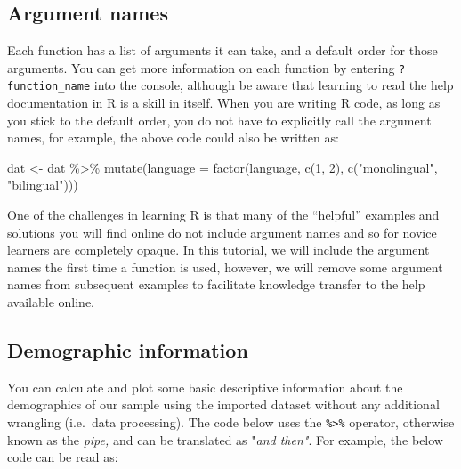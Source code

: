 \documentclass[
  english,
  doc,floatsintext]{apa6}
\newenvironment{Shaded}{\begin{snugshade}}{\end{snugshade}}
\newcommand{\AttributeTok}[1]{\textcolor[rgb]{0.77,0.63,0.00}{#1}}
\newcommand{\DecValTok}[1]{\textcolor[rgb]{0.00,0.00,0.81}{#1}}
\newcommand{\FunctionTok}[1]{\textcolor[rgb]{0.00,0.00,0.00}{#1}}
\newcommand{\NormalTok}[1]{#1}
\newcommand{\OtherTok}[1]{\textcolor[rgb]{0.56,0.35,0.01}{#1}}
\newcommand{\SpecialCharTok}[1]{\textcolor[rgb]{0.00,0.00,0.00}{#1}}
\newcommand{\StringTok}[1]{\textcolor[rgb]{0.31,0.60,0.02}{#1}}
\begin{document}
\hypertarget{argument-names}{%
\subsection{Argument names}\label{argument-names}}

Each function has a list of arguments it can take, and a default order for those arguments. You can get more information on each function by entering \texttt{?function\_name} into the console, although be aware that learning to read the help documentation in R is a skill in itself. When you are writing R code, as long as you stick to the default order, you do not have to explicitly call the argument names, for example, the above code could also be written as:

\begin{Shaded}
\begin{Highlighting}[]
\NormalTok{dat }\OtherTok{\textless{}{-}}\NormalTok{ dat }\SpecialCharTok{\%\textgreater{}\%}
  \FunctionTok{mutate}\NormalTok{(}\AttributeTok{language =} \FunctionTok{factor}\NormalTok{(language, }
                           \FunctionTok{c}\NormalTok{(}\DecValTok{1}\NormalTok{, }\DecValTok{2}\NormalTok{), }
                           \FunctionTok{c}\NormalTok{(}\StringTok{"monolingual"}\NormalTok{, }\StringTok{"bilingual"}\NormalTok{)))}
\end{Highlighting}
\end{Shaded}

One of the challenges in learning R is that many of the ``helpful'' examples and solutions you will find online do not include argument names and so for novice learners are completely opaque. In this tutorial, we will include the argument names the first time a function is used, however, we will remove some argument names from subsequent examples to facilitate knowledge transfer to the help available online.

\hypertarget{demographic-information}{%
\subsection{Demographic information}\label{demographic-information}}

You can calculate and plot some basic descriptive information about the demographics of our sample using the imported dataset without any additional wrangling (i.e.~data processing). The code below uses the \texttt{\%\textgreater{}\%} operator, otherwise known as the \emph{pipe,} and can be translated as "\emph{and then"}. For example, the below code can be read as:
\end{document}
